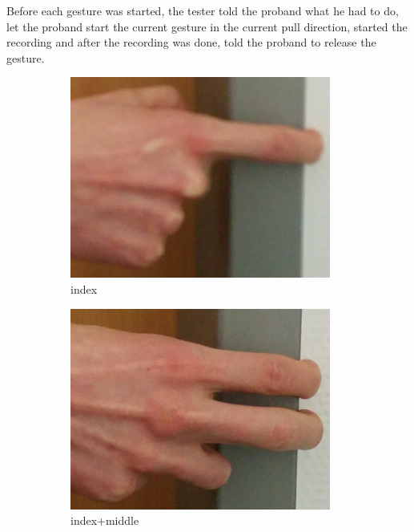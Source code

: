 \documentclass[journal]{IEEEtran}
\begin{document}
Before each gesture was started, the tester told the proband what he had to do, let the proband start the current gesture in the current pull direction, started the recording and after the recording was done, told the proband to release the gesture.

\begin{figure}[t!]
    \centering
    \begin{subfigure}{0.25\textwidth}
        \centering
        \includegraphics[width=.8\linewidth]{img/index}
        \caption{index}
    \end{subfigure}%
        \begin{subfigure}{0.25\textwidth}
        \centering
        \includegraphics[width=.8\linewidth]{img/index+middle}
        \caption{index+middle}
    \end{subfigure}%
        \begin{subfigure}{0.25\textwidth}
        \centering

\end{subfigure}
\end{figure}
\end{document}
